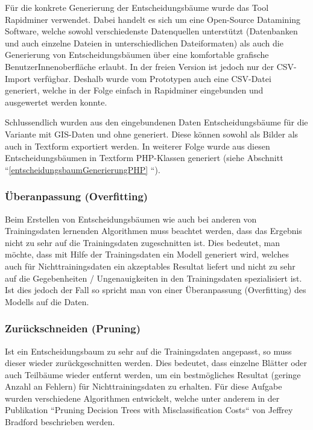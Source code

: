 Für die konkrete Generierung der Entscheidungsbäume wurde das Tool Rapidminer verwendet. Dabei handelt es sich um eine Open-Source Datamining Software, welche sowohl verschiedenste Datenquellen unterstützt (Datenbanken und auch einzelne Dateien in unterschiedlichen Dateiformaten) als auch die Generierung von Entscheidungsbäumen über eine komfortable grafische BenutzerInnenoberfläche erlaubt. In der freien Version ist jedoch nur der CSV-Import verfügbar. Deshalb wurde vom Prototypen auch eine CSV-Datei generiert, welche in der Folge einfach in Rapidminer eingebunden und ausgewertet werden konnte. 

Schlussendlich wurden aus den eingebundenen Daten Entscheidungsbäume für die Variante mit GIS-Daten und ohne generiert. Diese können sowohl als Bilder als auch in Textform exportiert werden. In weiterer Folge wurde aus diesen Entscheidungsbäumen in Textform PHP-Klassen generiert (siehe Abschnitt ``\ref{entscheidungsbaumGenerierungPHP} ``).

\subsubsection{Überanpassung (Overfitting)}
Beim Erstellen von Entscheidungsbäumen wie auch bei anderen von Trainingsdaten lernenden Algorithmen muss beachtet werden, dass das Ergebnis nicht zu sehr auf die Trainingsdaten zugeschnitten ist. Dies bedeutet, man möchte, dass mit Hilfe der Trainingsdaten ein Modell generiert wird, welches auch für Nichttrainingsdaten ein akzeptables Resultat liefert und nicht zu sehr auf die Gegebenheiten / Ungenauigkeiten in den Trainingsdaten spezialisiert ist. Ist dies jedoch der Fall so spricht man von einer Überanpassung (Overfitting) des Modells auf die Daten.  \cite{tom_dietterich_overfitting_1995}

\subsubsection{Zurückschneiden (Pruning)}
Ist ein Entscheidungsbaum zu sehr  auf die Trainingsdaten angepasst, so muss dieser wieder zurückgeschnitten werden. Dies bedeutet, dass einzelne Blätter oder auch Teilbäume wieder entfernt werden, um ein bestmögliches Resultat (geringe Anzahl an Fehlern) für Nichttrainingsdaten zu erhalten. Für diese Aufgabe wurden verschiedene Algorithmen entwickelt, welche unter anderem in der Publikation ``Pruning Decision Trees with Misclassification Costs`` von Jeffrey Bradford beschrieben werden. \cite{jeffrey_p._bradford_pruning_1998}

